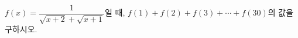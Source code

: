 \hspace*{2mm}\begin{minipage}[t]{\dimexpr\linewidth-2mm\relax}\vspace{0pt}
$f(x)=\dfrac{1}{\sqrt{x+2}+\sqrt{x+1}}$일 때, $f(1)+f(2)+f(3)+\cdots+f(30)$의 값을 구하시오.\end{minipage}
